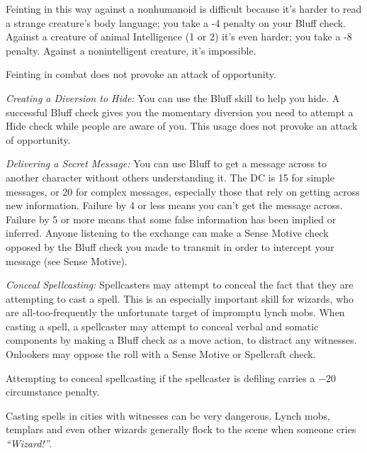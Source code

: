 Feinting in this way against a nonhumanoid is difficult because it’s harder to read a strange creature’s body language; you take a -4 penalty on your Bluff check. Against a creature of animal Intelligence (1 or 2) it’s even harder; you take a -8 penalty. Against a nonintelligent creature, it’s impossible.

Feinting in combat does not provoke an attack of opportunity.

\textit{Creating a Diversion to Hide:} You can use the Bluff skill to help you hide. A successful Bluff check gives you the momentary diversion you need to attempt a Hide check while people are aware of you. This usage does not provoke an attack of opportunity.

\textit{Delivering a Secret Message:} You can use Bluff to get a message across to another character without others understanding it. The DC is 15 for simple messages, or 20 for complex messages, especially those that rely on getting across new information. Failure by 4 or less means you can’t get the message across. Failure by 5 or more means that some false information has been implied or inferred. Anyone listening to the exchange can make a Sense Motive check opposed by the Bluff check you made to transmit in order to intercept your message (see Sense Motive).

\textit{Conceal Spellcasting:} Spellcasters may attempt to conceal the fact that they are attempting to cast a spell. This is an especially important skill for wizards, who are all-too-frequently the unfortunate target of impromptu lynch mobs. When casting a spell, a spellcaster may attempt to conceal verbal and somatic components by making a Bluff check as a move action, to distract any witnesses. Onlookers may oppose the roll with a Sense Motive or Spellcraft check.

Attempting to conceal spellcasting if the spellcaster is defiling carries a $-20$ circumstance penalty.


Casting spells in cities with witnesses can be very dangerous. Lynch mobs, templars and even other wizards generally flock to the scene when someone cries \textit{``Wizard!''}.

